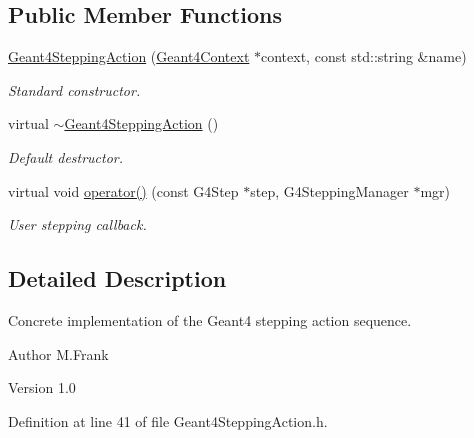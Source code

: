 \subsection*{Public Member Functions}
\begin{DoxyCompactItemize}
\item 
\hyperlink{class_d_d4hep_1_1_simulation_1_1_geant4_stepping_action_a90a69104683bd6828b42e5d9915ef3a1}{Geant4SteppingAction} (\hyperlink{class_d_d4hep_1_1_simulation_1_1_geant4_context}{Geant4Context} $\ast$context, const std::string \&name)
\begin{DoxyCompactList}\small\item\em Standard constructor. \item\end{DoxyCompactList}\item 
virtual \hyperlink{class_d_d4hep_1_1_simulation_1_1_geant4_stepping_action_a906c5651b3a3f39a44b4a3b5ab236375}{$\sim$Geant4SteppingAction} ()
\begin{DoxyCompactList}\small\item\em Default destructor. \item\end{DoxyCompactList}\item 
virtual void \hyperlink{class_d_d4hep_1_1_simulation_1_1_geant4_stepping_action_ab6b61f6eaed6d06ddb3a7ed319258317}{operator()} (const G4Step $\ast$step, G4SteppingManager $\ast$mgr)
\begin{DoxyCompactList}\small\item\em User stepping callback. \item\end{DoxyCompactList}\end{DoxyCompactItemize}


\subsection{Detailed Description}
Concrete implementation of the Geant4 stepping action sequence. \begin{DoxyAuthor}{Author}
M.Frank 
\end{DoxyAuthor}
\begin{DoxyVersion}{Version}
1.0 
\end{DoxyVersion}


Definition at line 41 of file Geant4SteppingAction.h.

